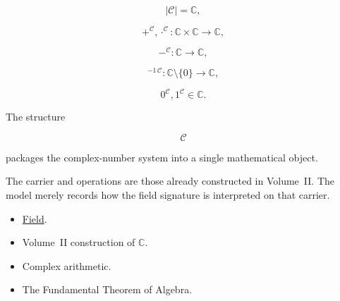 
\begin{remark*}

\[
|\mathcal C|
=
\mathbb C,
\]

\[
+^{\mathcal C},
\cdot^{\mathcal C}
:
\mathbb C\times\mathbb C
\to
\mathbb C,
\]

\[
-^{\mathcal C}
:
\mathbb C
\to
\mathbb C,
\]

\[
{}^{-1\,\mathcal C}
:
\mathbb C\setminus\{0\}
\to
\mathbb C,
\]

\[
0^{\mathcal C},
1^{\mathcal C}
\in
\mathbb C.
\]

\end{remark*}


\begin{remark*}[Interpretation]

The structure

\[
\mathcal C
\]

packages the complex-number system into a single mathematical object.

The carrier and operations are those already constructed in Volume~II. The
model merely records how the field signature is interpreted on that carrier.

\end{remark*}


\begin{remark*}[Dependencies]

\begin{itemize}
    \item \hyperref[def:field]{Field}.
    \item Volume~II construction of $\mathbb C$.
    \item Complex arithmetic.
    \item The Fundamental Theorem of Algebra.
\end{itemize}

\end{remark*}


